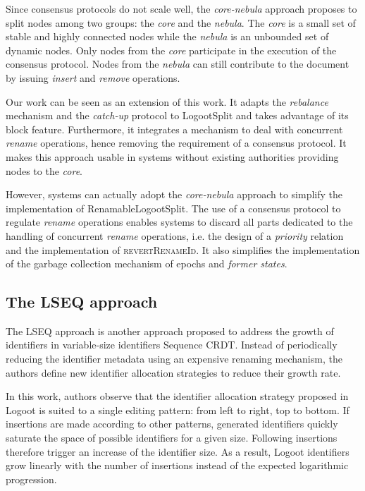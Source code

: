 \documentclass[10pt,journal,compsoc]{IEEEtran}
\newcommand{\ie}{i.e. }
\begin{document}
Since consensus protocols do not scale well, the \emph{core-nebula} approach proposes to split nodes among two groups: the \emph{core} and the \emph{nebula}.
The \emph{core} is a small set of stable and highly connected nodes while the \emph{nebula} is an unbounded set of dynamic nodes.
Only nodes from the \emph{core} participate in the execution of the consensus protocol.
Nodes from the \emph{nebula} can still contribute to the document by issuing \emph{insert} and \emph{remove} operations.

Our work can be seen as an extension of this work.
It adapts the \emph{rebalance} mechanism and the \emph{catch-up} protocol to LogootSplit and takes advantage of its block feature.
Furthermore, it integrates a mechanism to deal with concurrent \emph{rename} operations, hence removing the requirement of a consensus protocol.
It makes this approach usable in systems without existing authorities providing nodes to the \emph{core}.

However, systems can actually adopt the \emph{core-nebula} approach to simplify the implementation of RenamableLogootSplit.
The use of a consensus protocol to regulate \emph{rename} operations enables systems to discard all parts dedicated to the handling of concurrent \emph{rename} operations, \ie the design of a \emph{priority} relation and the implementation of \textsc{revertRenameId}.
It also simplifies the implementation of the garbage collection mechanism of epochs and \emph{former states}.

\subsection{The LSEQ approach}

The LSEQ approach \cite{lseq2013, lseq2017} is another approach proposed to address the growth of identifiers in variable-size identifiers Sequence \ac{CRDT}. Instead of periodically reducing the identifier metadata using an expensive renaming mechanism, the authors define new identifier allocation strategies to reduce their growth rate.

In this work, authors observe that the identifier allocation strategy proposed in Logoot\cite{WeissICDCS09} is suited to a single editing pattern: from left to right, top to bottom.
If insertions are made according to other patterns, generated identifiers quickly saturate the space of possible identifiers for a given size.
Following insertions therefore trigger an increase of the identifier size.
As a result, Logoot identifiers grow linearly with the number of insertions instead of the expected logarithmic progression.
\end{document}
